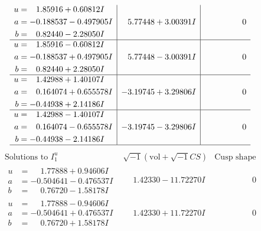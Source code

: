 \documentclass[1p]{elsarticle_modified}
\theoremstyle{definition}
\newcommand{\I}{\sqrt{-1}}
\begin{document}
$$\begin{array}{c|c|c}
\begin{aligned}
u &= \phantom{-}1.85916 + 0.60812 I \\
a &= -0.188537 - 0.497905 I \\
b &= \phantom{-}0.82440 - 2.28050 I\end{aligned}
 & \phantom{-}5.77448 + 3.00391 I & \phantom{-0.000000 } 0 \\ \hline\begin{aligned}
u &= \phantom{-}1.85916 - 0.60812 I \\
a &= -0.188537 + 0.497905 I \\
b &= \phantom{-}0.82440 + 2.28050 I\end{aligned}
 & \phantom{-}5.77448 - 3.00391 I & \phantom{-0.000000 } 0 \\ \hline\begin{aligned}
u &= \phantom{-}1.42988 + 1.40107 I \\
a &= \phantom{-}0.164074 + 0.655578 I \\
b &= -0.44938 + 2.14186 I\end{aligned}
 & -3.19745 + 3.29806 I & \phantom{-0.000000 } 0 \\ \hline\begin{aligned}
u &= \phantom{-}1.42988 - 1.40107 I \\
a &= \phantom{-}0.164074 - 0.655578 I \\
b &= -0.44938 - 2.14186 I\end{aligned}
 & -3.19745 - 3.29806 I & \phantom{-0.000000 } 0\\
 \hline 
 \end{array}$$\newpage$$\begin{array}{c|c|c}  
\text{Solutions to }I^u_{1}& \I (\text{vol} + \sqrt{-1}CS) & \text{Cusp shape}\\
 \hline 
\begin{aligned}
u &= \phantom{-}1.77888 + 0.94606 I \\
a &= -0.504641 - 0.476537 I \\
b &= \phantom{-}0.76720 - 1.58178 I\end{aligned}
 & \phantom{-}1.42330 - 11.72270 I & \phantom{-0.000000 } 0 \\ \hline\begin{aligned}
u &= \phantom{-}1.77888 - 0.94606 I \\
a &= -0.504641 + 0.476537 I \\
b &= \phantom{-}0.76720 + 1.58178 I\end{aligned}
 & \phantom{-}1.42330 + 11.72270 I & \phantom{-0.000000 } 0 \\ \hline\begin{aligned}

\end{aligned}
\end{array}$$
\end{document}
